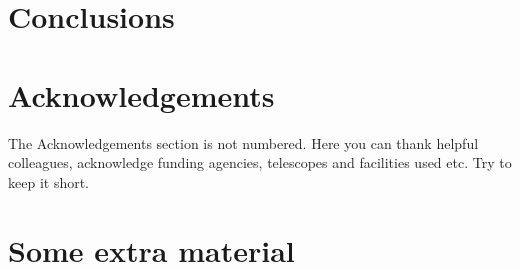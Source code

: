 \documentclass[fleqn,usenatbib]{mnras}
\begin{document}
\section{Conclusions}








\section*{Acknowledgements}

The Acknowledgements section is not numbered. Here you can thank helpful
colleagues, acknowledge funding agencies, telescopes and facilities used etc.
Try to keep it short.








\appendix

\section{Some extra material}




\bsp	%
\label{lastpage}
\end{document}
